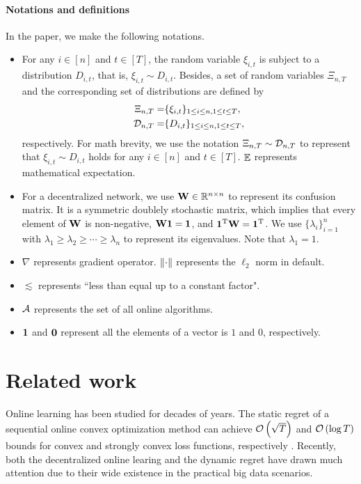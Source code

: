 \documentclass{article}
\begin{document}
\paragraph{Notations and definitions}
In the paper, we make the following notations.
\begin{itemize}
\item For any $i\in[n]$ and $t\in[T]$, the random variable $\xi_{i,t}$ is subject to a distribution $D_{i,t}$, that is, $\xi_{i,t} \sim D_{i,t}$. Besides, a set of random variables $\Xi_{n,T}$ and the corresponding set of distributions are defined by
\begin{align}
\nonumber
\Xi_{n,T} = & \{ \xi_{i,t} \}_{1\le i \le n, 1 \le t \le T}, \\
\mathcal{D}_{n,T} = & \{ D_{i,t} \}_{1\le i \le n, 1 \le t \le T},
\end{align} respectively. For math brevity, we use the notation $\Xi_{n,T} \sim \mathcal{D}_{n,T}$ to represent that $\xi_{i,t} \sim D_{i,t}$ holds for any $i\in[n]$ and $t\in[T]$. $\mathop{\mathbb{E}}$ represents mathematical expectation.
\item For a decentralized network, we use ${\bf W} \in\mathbb{R}^{n\times n}$ to represent its confusion matrix. It is a symmetric doublely stochastic matrix, which implies that every element of ${\bf W}$ is non-negative, ${\bf W} {\bf 1} = {\bf 1}$, and ${\bf 1}^{\rm T}{\bf W}  = {\bf 1}^{\rm T}$. We use $\{\lambda_i\}_{i=1}^n$ with $\lambda_1 \ge \lambda_2 \ge \cdots \ge \lambda_n$ to represent its eigenvalues. Note that $\lambda_1 = 1$.
\item $\nabla$ represents gradient operator. $\left\lVert\cdot\right\rVert$ represents the $\ell_2$ norm in default.
\item $\lesssim$ represents ``less than equal up to a constant factor".
\item ${\mathcal{A}}$ represents the set of all online algorithms.
\item ${\bf 1}$ and ${\bf 0}$ represent all the elements of a vector is $1$ and $0$, respectively.
\end{itemize} 
    


\section{Related work}
\label{sect_related_work}
Online learning has been studied for decades of years. The static regret of a sequential online convex optimization method can achieve ${\mathcal{O}\left( \sqrt{T} \right)}$ and ${\mathcal{O}\left( \log T \right)}$ bounds for convex and strongly convex loss functions, respectively \citep{Hazan2016Introduction,ShalevShwartz:2012dz,introduction-online-optimization}. Recently, both the decentralized online learing and the dynamic regret have drawn much attention due to their wide existence in the practical big data scenarios.
\end{document}
